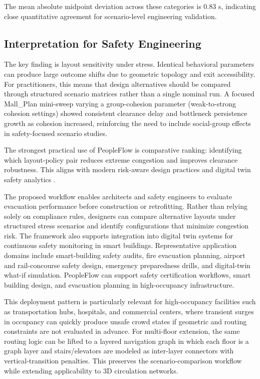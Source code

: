 \documentclass[nolineno]{ieeeaccess}
\begin{document}
The mean absolute midpoint deviation across these categories is 0.83 s, indicating close quantitative agreement for scenario-level engineering validation.

\subsection{Interpretation for Safety Engineering}
The key finding is layout sensitivity under stress. Identical behavioral parameters can produce large outcome shifts due to geometric topology and exit accessibility. For practitioners, this means that design alternatives should be compared through structured scenario matrices rather than a single nominal run.
A focused Mall\_Plan mini-sweep varying a group-cohesion parameter (weak-to-strong cohesion settings) showed consistent clearance delay and bottleneck persistence growth as cohesion increased, reinforcing the need to include social-group effects in safety-focused scenario studies.

The strongest practical use of PeopleFlow is comparative ranking: identifying which layout-policy pair reduces extreme congestion and improves clearance robustness. This aligns with modern risk-aware design practices and digital twin safety analytics \cite{haghani2020,kuligowski}.

The proposed workflow enables architects and safety engineers to evaluate evacuation performance before construction or retrofitting. Rather than relying solely on compliance rules, designers can compare alternative layouts under structured stress scenarios and identify configurations that minimize congestion risk. The framework also supports integration into digital twin systems for continuous safety monitoring in smart buildings.
Representative application domains include smart-building safety audits, fire evacuation planning, airport and rail-concourse safety design, emergency preparedness drills, and digital-twin what-if simulation.
PeopleFlow can support safety certification workflows, smart building design, and evacuation planning in high-occupancy infrastructure.

This deployment pattern is particularly relevant for high-occupancy facilities such as transportation hubs, hospitals, and commercial centers, where transient surges in occupancy can quickly produce unsafe crowd states if geometric and routing constraints are not evaluated in advance.
For multi-floor extension, the same routing logic can be lifted to a layered navigation graph in which each floor is a graph layer and stairs/elevators are modeled as inter-layer connectors with vertical-transition penalties. This preserves the scenario-comparison workflow while extending applicability to 3D circulation networks.
\end{document}
